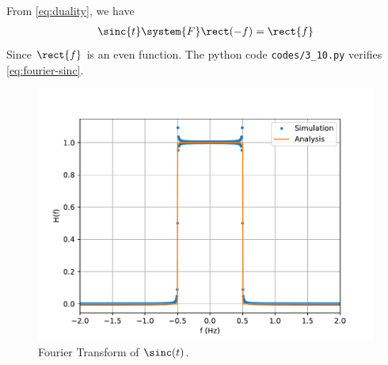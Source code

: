 \documentclass[journal,12pt,twocolumn]{IEEEtran}
\renewcommand\thesection{\arabic{section}}
\begin{document}
\begin{enumerate}[label=\thesection.\arabic*
,ref=\thesection.\theenumi]
\solution From \eqref{eq:duality}, we have 
\begin{align}
    \sinc{t}\system{F}\rect(-f)=\rect{f}
    \label{eq:fourier-sinc}
\end{align}
Since $\rect{f}$ is an even function.
The python code \texttt{codes/3\_10.py} verifies \eqref{eq:fourier-sinc}.
\begin{figure}[!ht]
    \includegraphics[width=\columnwidth]{figs/3_10.pdf}
    \caption{Fourier Transform of $\sinc(t)$.}
    \label{eq:fig-fourier-sinc}
\end{figure}
\end{enumerate}
\end{document}
